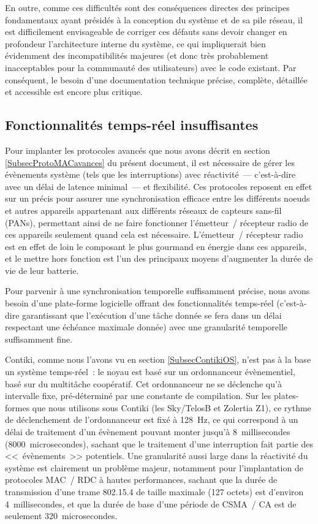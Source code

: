 En outre, comme ces difficultés sont des conséquences directes des principes
fondamentaux ayant présidés à la conception du système et de sa pile réseau,
il est difficilement envisageable de corriger ces défauts sans devoir
changer en profondeur l'architecture interne du système, ce qui
impliquerait bien évidemment des incompatibilités majeures (et donc
très probablement inacceptables pour la communauté des utilisateurs)
avec le code existant. Par conséquent, le besoin d'une documentation
technique précise, complète, détaillée et accessible est encore plus
critique.


\subsection{Fonctionnalités temps-réel insuffisantes}
\label{SubsecContikiTempsReel}

Pour implanter les protocoles avancés que nous avons décrit en section
\vref{SubsecProtoMACavances} du présent document, il est nécessaire de
gérer les évènements système (tels que les interruptions) avec réactivité~---
c'est-à-dire avec un délai de latence minimal~--- et flexibilité. Ces
protocoles reposent en effet sur un  précis pour assurer
une synchronisation efficace entre les différents noeuds et autres
appareils appartenant aux différents réseaux de capteurs sans-fil (PANs),
permettant ainsi de ne faire fonctionner l'émetteur~/ récepteur radio
de ces appareils seulement quand cela est nécessaire. L'émetteur~/
récepteur radio est en effet de loin le composant le plus gourmand en
énergie dans ces appareils, et le mettre hors fonction est l'un des
principaux moyens d'augmenter la durée de vie de leur batterie.

Pour parvenir à une synchronisation temporelle suffisamment précise, nous
avons besoin d'une plate-forme logicielle offrant des fonctionnalités
temps-réel (c'est-à-dire garantissant que l'exécution d'une tâche donnée
se fera dans un délai respectant une échéance maximale donnée) avec une
granularité temporelle suffisamment fine.

Contiki, comme nous l'avons vu en section \vref{SubsecContikiOS}, n'est
pas à la base un système temps-réel~: le noyau est basé sur un ordonnanceur
évènementiel, basé sur du multitâche coopératif. Cet ordonnanceur ne se
déclenche qu'à intervalle fixe, pré-déterminé par une constante de
compilation. Sur les plates-formes que nous utilisons sous Contiki (les
 Sky/TelosB et Zolertia Z1), ce rythme de déclenchement de
l'ordonnanceur est fixé à 128~Hz, ce qui correspond à un délai de traitement
d'un évènement pouvant monter jusqu'à 8~millisecondes (8000~microsecondes),
sachant que le traitement d'une interruption fait partie des <<~évènements~>>
potentiels. Une granularité aussi large dans la réactivité du système est
clairement un problème majeur, notamment pour l'implantation de protocoles
MAC~/ RDC à hautes performances, sachant que la durée de transmission d'une
trame 802.15.4 de taille maximale (127 octets) est d'environ 4~millisecondes,
et que la durée de base d'une période de  CSMA~/ CA est de
seulement 320~microsecondes.

